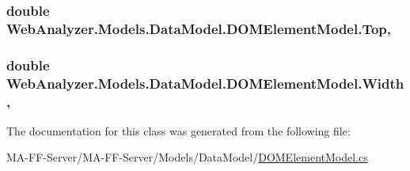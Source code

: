 \subsubsection[{Top}]{\setlength{\rightskip}{0pt plus 5cm}double Web\+Analyzer.\+Models.\+Data\+Model.\+D\+O\+M\+Element\+Model.\+Top\hspace{0.3cm}{\ttfamily [get]}, {\ttfamily [set]}}\label{class_web_analyzer_1_1_models_1_1_data_model_1_1_d_o_m_element_model_a1f17dcaf6e924292f3b6a8ade726941d}
\hypertarget{class_web_analyzer_1_1_models_1_1_data_model_1_1_d_o_m_element_model_a34aa9812237c151017294753a8ee77a7}{}
\subsubsection[{Width}]{\setlength{\rightskip}{0pt plus 5cm}double Web\+Analyzer.\+Models.\+Data\+Model.\+D\+O\+M\+Element\+Model.\+Width\hspace{0.3cm}{\ttfamily [get]}, {\ttfamily [set]}}\label{class_web_analyzer_1_1_models_1_1_data_model_1_1_d_o_m_element_model_a34aa9812237c151017294753a8ee77a7}


The documentation for this class was generated from the following file\+:\begin{DoxyCompactItemize}
\item 
M\+A-\/\+F\+F-\/\+Server/\+M\+A-\/\+F\+F-\/\+Server/\+Models/\+Data\+Model/\hyperlink{_d_o_m_element_model_8cs}{D\+O\+M\+Element\+Model.\+cs}\end{DoxyCompactItemize}
